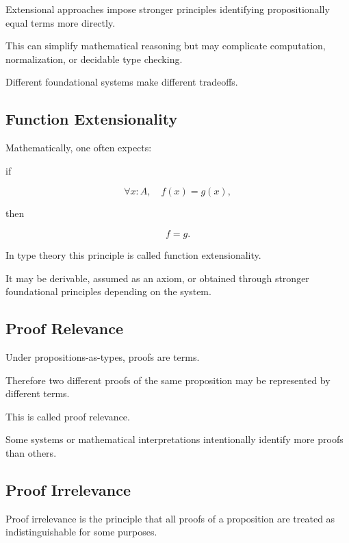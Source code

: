 Extensional approaches impose stronger principles identifying
propositionally equal terms more directly.

This can simplify mathematical reasoning but may complicate computation,
normalization, or decidable type checking.

Different foundational systems make different tradeoffs.

\subsection{Function Extensionality}
\label{subsec:function-extensionality}

Mathematically, one often expects:

if

\[
\forall x:A,
\quad
f(x)=g(x),
\]

then

\[
\boxed{
f=g.
}
\]

In type theory this principle is called function extensionality.

It may be derivable, assumed as an axiom, or obtained through stronger
foundational principles depending on the system.

\subsection{Proof Relevance}
\label{subsec:proof-relevance}

Under propositions-as-types, proofs are terms.

Therefore two different proofs of the same proposition may be represented
by different terms.

This is called proof relevance.

Some systems or mathematical interpretations intentionally identify more
proofs than others.

\subsection{Proof Irrelevance}
\label{subsec:proof-irrelevance}

Proof irrelevance is the principle that all proofs of a proposition are
treated as indistinguishable for some purposes.

